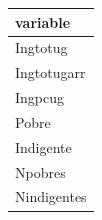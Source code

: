 
\begin{tabular}{l}
\toprule
variable\\
\midrule
Ingtotug\\
Ingtotugarr\\
Ingpcug\\
Pobre\\
Indigente\\
\addlinespace
Npobres\\
Nindigentes\\
\bottomrule
\end{tabular}
